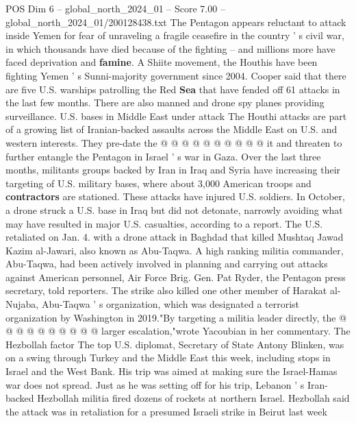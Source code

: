 \begin{textsample}{POS Dim 6 – global\_north\_2024\_01 – Score 7.00 – global\_north\_2024\_01/200128438.txt}
The Pentagon appears reluctant to attack inside Yemen for fear of unraveling a fragile ceasefire in the country ' s civil war, in which thousands have died because of the fighting -- and millions more have faced deprivation and \textbf{famine}.
A Shiite movement, the Houthis have been fighting Yemen ' s Sunni-majority government since 2004.
Cooper said that there are five U.S. warships patrolling the Red \textbf{Sea} that have fended off 61 attacks in the last few months.
There are also manned and drone spy planes providing surveillance.
U.S. bases in Middle East under attack The Houthi attacks are part of a growing list of Iranian-backed assaults across the Middle East on U.S. and western interests.
They pre-date the @ @ @ @ @ @ @ @ @ @ it and threaten to further entangle the Pentagon in Israel ' s war in Gaza.
Over the last three months, militants groups backed by Iran in Iraq and Syria have increasing their targeting of U.S. military bases, where about 3,000 American troops and \textbf{contractors} are stationed.
These attacks have injured U.S. soldiers.
In October, a drone struck a U.S. base in Iraq but did not detonate, narrowly avoiding what may have resulted in major U.S. casualties, according to a report.
The U.S. retaliated on Jan. 4. with a drone attack in Baghdad that killed Mushtaq Jawad Kazim al-Jawari, also known as Abu-Taqwa.
A high ranking militia commander, Abu-Taqwa, had been actively involved in planning and carrying out attacks against American personnel, Air Force Brig.
Gen.
Pat Ryder, the Pentagon press secretary, told reporters.
The strike also killed one other member of Harakat al-Nujaba, Abu-Taqwa ' s organization, which was designated a terrorist organization by Washington in 2019."By targeting a militia leader directly, the @ @ @ @ @ @ @ @ @ @ larger escalation,"wrote Yacoubian in her commentary.
The Hezbollah factor The top U.S. diplomat, Secretary of State Antony Blinken, was on a swing through Turkey and the Middle East this week, including stops in Israel and the West Bank.
His trip was aimed at making sure the Israel-Hamas war does not spread.
Just as he was setting off for his trip, Lebanon ' s Iran-backed Hezbollah militia fired dozens of rockets at northern Israel.
Hezbollah said the attack was in retaliation for a presumed Israeli strike in Beirut last week

\end{textsample}

